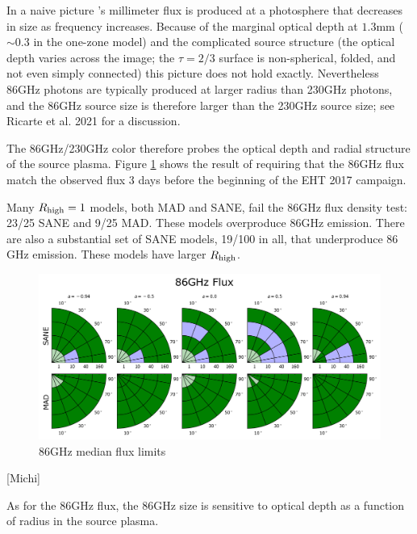 
In a naive picture \sgra's millimeter flux is produced at a photosphere that decreases in size as frequency increases.  Because of the marginal optical depth at $1.3$mm ($\sim 0.3$ in the one-zone model) and the complicated source structure (the optical depth varies across the image; the $\tau = 2/3$ surface is non-spherical, folded, and not even simply connected) this picture does not hold exactly.  Nevertheless 86GHz photons are typically produced at larger radius than 230GHz photons, and the 86GHz source size is therefore larger than the 230GHz source size; see Ricarte et al. 2021 for a discussion.

The 86GHz/230GHz color therefore probes the optical depth and radial structure of the source plasma.  Figure \ref{fig:cmp_86ghz_flux} shows the result of requiring that the 86GHz flux match the observed flux 3 days before the beginning of the EHT 2017 campaign.

Many $R_\mathrm{high} = 1$ models, both MAD and SANE, fail the $86$GHz flux density test: 23/25 SANE and 9/25 MAD.  These models overproduce $86$GHz emission.
There are also a substantial set of SANE models, 19/100 in all, that underproduce $86$GHz emission.  These models have larger $R_\mathrm{high}$.

\begin{figure}
  \centering
  \includegraphics[width=\columnwidth]{./figures/86GHz_flux_Constraints.png}
  \caption{86GHz median flux limits}
  \label{fig:cmp_86ghz_flux}
\end{figure}

[Michi]


As for the $86$GHz flux, the $86$GHz size is sensitive to optical depth as a function of radius in the source plasma.

